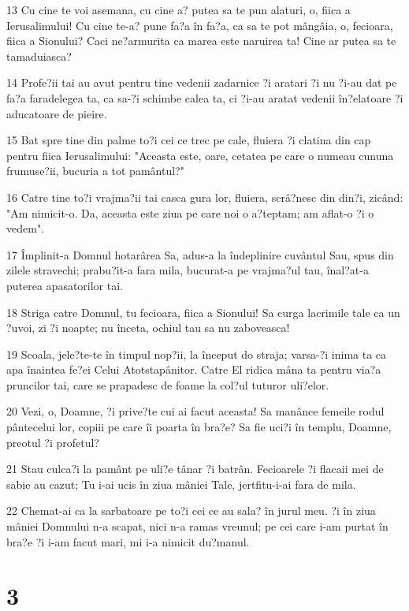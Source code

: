 \par 13 Cu cine te voi asemana, cu cine a? putea sa te pun alaturi, o, fiica a Ierusalimului! Cu cine te-a? pune fa?a în fa?a, ca sa te pot mângâia, o, fecioara, fiica a Sionului? Caci ne?armurita ca marea este naruirea ta! Cine ar putea sa te tamaduiasca?
\par 14 Profe?ii tai au avut pentru tine vedenii zadarnice ?i aratari ?i nu ?i-au dat pe fa?a faradelegea ta, ca sa-?i schimbe calea ta, ci ?i-au aratat vedenii în?elatoare ?i aducatoare de pieire.
\par 15 Bat spre tine din palme to?i cei ce trec pe cale, fluiera ?i clatina din cap pentru fiica Ierusalimului: "Aceasta este, oare, cetatea pe care o numeau cununa frumuse?ii, bucuria a tot pamântul?"
\par 16 Catre tine to?i vrajma?ii tai casca gura lor, fluiera, scrâ?nesc din din?i, zicând: "Am nimicit-o. Da, aceasta este ziua pe care noi o a?teptam; am aflat-o ?i o vedem".
\par 17 Împlinit-a Domnul hotarârea Sa, adus-a la îndeplinire cuvântul Sau, spus din zilele stravechi; prabu?it-a fara mila, bucurat-a pe vrajma?ul tau, înal?at-a puterea apasatorilor tai.
\par 18 Striga catre Domnul, tu fecioara, fiica a Sionului! Sa curga lacrimile tale ca un ?uvoi, zi ?i noapte; nu înceta, ochiul tau sa nu zaboveasca!
\par 19 Scoala, jele?te-te în timpul nop?ii, la început do straja; varsa-?i inima ta ca apa înaintea fe?ei Celui Atotstapânitor. Catre El ridica mâna ta pentru via?a pruncilor tai, care se prapadesc de foame la col?ul tuturor uli?elor.
\par 20 Vezi, o, Doamne, ?i prive?te cui ai facut aceasta! Sa manânce femeile rodul pântecelui lor, copiii pe care îi poarta în bra?e? Sa fie uci?i în templu, Doamne, preotul ?i profetul?
\par 21 Stau culca?i la pamânt pe uli?e tânar ?i batrân. Fecioarele ?i flacaii mei de sabie au cazut; Tu i-ai ucis în ziua mâniei Tale, jertfitu-i-ai fara de mila.
\par 22 Chemat-ai ca la sarbatoare pe to?i cei ce au sala? în jurul meu. ?i în ziua mâniei Domnului n-a scapat, nici n-a ramas vreunul; pe cei care i-am purtat în bra?e ?i i-am facut mari, mi i-a nimicit du?manul.

\chapter{3}

